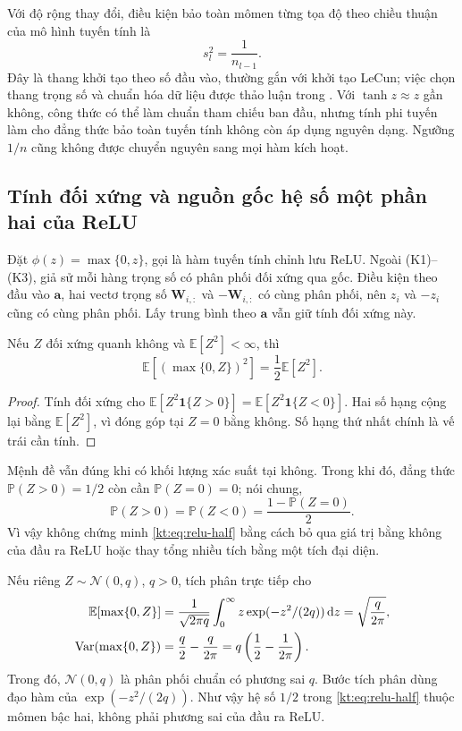 Với độ rộng thay đổi, điều kiện bảo toàn mômen từng tọa độ theo
chiều thuận của mô hình tuyến tính là
\begin{equation}
 s_l^2=\frac1{n_{l-1}}.
 \label{kt:eq:lecun}
\end{equation}
Đây là thang khởi tạo theo số đầu vào, thường gắn với khởi tạo
LeCun; việc chọn thang trọng số và chuẩn hóa dữ liệu được thảo luận
trong \cite{lecun1998}. Với $\tanh z\approx z$ gần không, công
thức có thể làm chuẩn tham chiếu ban đầu, nhưng tính phi tuyến làm
cho đẳng thức bảo toàn tuyến tính không còn áp dụng nguyên dạng.
Ngưỡng $1/n$ cũng không được chuyển nguyên sang mọi hàm kích hoạt.

\subsection{Tính đối xứng và nguồn gốc hệ số một phần hai của ReLU}

Đặt $\phi(z)=\max\{0,z\}$, gọi là hàm tuyến tính chỉnh lưu ReLU.
Ngoài (K1)--(K3), giả sử mỗi hàng trọng số có phân phối đối xứng
qua gốc. Điều kiện theo đầu vào $\mathbf a$, hai vectơ trọng số
$\mathbf W_{i,:}$ và $-\mathbf W_{i,:}$ có cùng phân phối, nên
$z_i$ và $-z_i$ cũng có cùng phân phối. Lấy trung bình theo
$\mathbf a$ vẫn giữ tính đối xứng này.

\begin{proposition}
Nếu $Z$ đối xứng quanh không và $\mathbb E[Z^2]<\infty$, thì
\begin{equation}
 \mathbb E[(\max\{0,Z\})^2]=\frac12\mathbb E[Z^2].
 \label{kt:eq:relu-half}
\end{equation}
\end{proposition}
\begin{proof}
Tính đối xứng cho
$\mathbb E[Z^2\mathbf1\{Z>0\}]
=\mathbb E[Z^2\mathbf1\{Z<0\}]$.
Hai số hạng cộng lại bằng $\mathbb E[Z^2]$, vì đóng góp tại
$Z=0$ bằng không. Số hạng thứ nhất chính là vế trái cần tính.
\end{proof}
Mệnh đề vẫn đúng khi có khối lượng xác suất tại không. Trong khi
đó, đẳng thức $\mathbb P(Z>0)=1/2$ còn cần
$\mathbb P(Z=0)=0$; nói chung,
\begin{equation}
 \mathbb P(Z>0)=\mathbb P(Z<0)
       =\frac{1-\mathbb P(Z=0)}2.
 \label{kt:eq:zero-atom}
\end{equation}
Vì vậy không chứng minh \eqref{kt:eq:relu-half} bằng cách bỏ qua
giá trị bằng không của đầu ra ReLU hoặc thay tổng nhiều tích bằng
một tích đại diện.

Nếu riêng $Z\sim\mathcal N(0,q)$, $q>0$, tích phân trực tiếp cho
\begin{align}
 \mathbb E[\max\{0,Z\}]
 &=\frac1{\sqrt{2\pi q}}\int_0^\infty
               z\exp(-z^2/(2q))\,\mathrm dz
   =\sqrt{\frac q{2\pi}},\notag\\
 \operatorname{Var}(\max\{0,Z\})
 &=\frac q2-\frac q{2\pi}
   =q\left(\frac12-\frac1{2\pi}\right).
 \label{kt:eq:relu-gaussian-variance}
\end{align}
Trong đó, $\mathcal N(0,q)$ là phân phối chuẩn có phương sai $q$.
Bước tích phân dùng đạo hàm của $\exp(-z^2/(2q))$.
Như vậy hệ số $1/2$ trong \eqref{kt:eq:relu-half} thuộc mômen
bậc hai, không phải phương sai của đầu ra ReLU.

